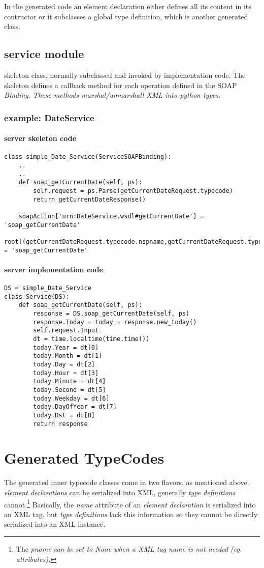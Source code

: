 In the generated code an element declaration either defines all its content in
its contructor or it subclasses a global type definition, which is another
generated class.


\subsection{service module}
skeleton class, normally subclassed and invoked by implementation code.  The
skeleton defines a callback method for each operation defined in the SOAP
\it{Binding}.  These methods marshal/unmarshall XML into python types.

\subsubsection{example: DateService}
\paragraph{server skeleton code}
\begin{verbatim}
class simple_Date_Service(ServiceSOAPBinding):
    ..
    ..
    def soap_getCurrentDate(self, ps):
        self.request = ps.Parse(getCurrentDateRequest.typecode)
        return getCurrentDateResponse()

    soapAction['urn:DateService.wsdl#getCurrentDate'] = 'soap_getCurrentDate'
    root[(getCurrentDateRequest.typecode.nspname,getCurrentDateRequest.typecode.pname)] = 'soap_getCurrentDate'

\end{verbatim}
\paragraph{server implementation code}
\begin{verbatim}
DS = simple_Date_Service
class Service(DS):
    def soap_getCurrentDate(self, ps):
        response = DS.soap_getCurrentDate(self, ps)
        response.Today = today = response.new_today()
        self.request.Input
        dt = time.localtime(time.time())
        today.Year = dt[0]
        today.Month = dt[1]
        today.Day = dt[2]
        today.Hour = dt[3]
        today.Minute = dt[4]
        today.Second = dt[5]
        today.Weekday = dt[6]
        today.DayOfYear = dt[7]
        today.Dst = dt[8]
        return response
\end{verbatim}


\section{Generated TypeCodes}
The generated inner typecode classes come in two flavors, as mentioned above. 
{\it element declarations} can be serialized into XML, generally {\it type
definitions} cannot.\footnote{The \it{pname} can be set to \it{None} when a XML
tag name is not needed (eg. attributes).}   Basically, the {\it name}
attribute of an {\it element declaration} is serialized into an XML tag, but
{\it type definitions} lack this information so they cannot be directly
serialized into an XML instance.  

